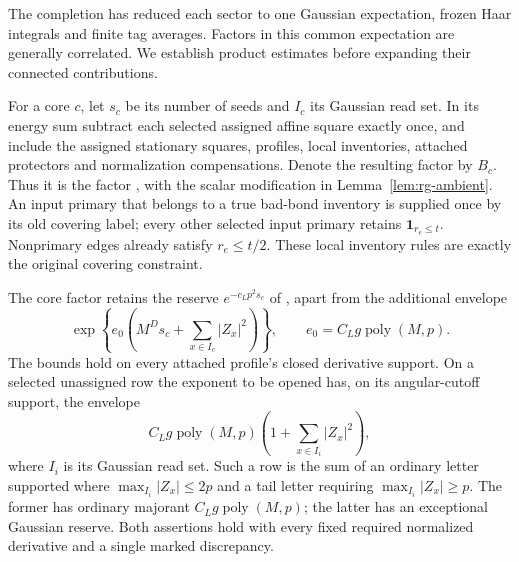 The completion has reduced each sector to one Gaussian expectation,
frozen Haar integrals and finite tag averages.  Factors in this common
expectation are generally correlated.  We establish product estimates
before expanding their connected contributions.

For a core $c$, let $s_c$ be its number of seeds and $I_c$ its Gaussian
read set.  In its energy sum subtract each selected assigned affine
square exactly once, and include the assigned stationary squares,
profiles, local inventories, attached protectors and normalization
compensations.  Denote the resulting factor by $B_c$.  Thus it is the
factor , with the scalar modification in
Lemma~\ref{lem:rg-ambient}.  An input primary that belongs to a true
bad-bond inventory is supplied once by its old covering label; every
other selected input primary retains $\mathbf1_{r_e\le t}$.  Nonprimary
edges already satisfy $r_e\le t/2$.  These local inventory rules are
exactly the original covering constraint.

\begin{lemma}
\label{lem:rg-reserves}
The core factor retains the reserve $e^{-c_Lp^2s_c}$ of
, apart from the additional envelope
\begin{equation}
 \exp\left\{e_0\left(M^Ds_c+
                         \sum_{x\in I_c}|Z_x|^2\right)\right\},
 \qquad e_0=C_Lg\operatorname{poly}(M,p).
 \label{eq:orig-7}
\end{equation}
The bounds hold on every attached profile's closed derivative support.
On a selected unassigned row the exponent to be opened has, on its
angular-cutoff support, the envelope
\begin{equation}
 C_Lg\operatorname{poly}(M,p)
                 \left(1+\sum_{x\in I_i}|Z_x|^2\right),
 \label{eq:orig-8}
\end{equation}
where $I_i$ is its Gaussian read set.  Such a row is the sum of an
ordinary letter supported where $\max_{I_i}|Z_x|\le2p$ and a tail
letter requiring $\max_{I_i}|Z_x|\ge p$.  The former has ordinary
majorant $C_Lg\operatorname{poly}(M,p)$; the latter has an exceptional
Gaussian reserve.  Both assertions hold with every fixed required
normalized derivative and a single marked discrepancy.
\end{lemma}


